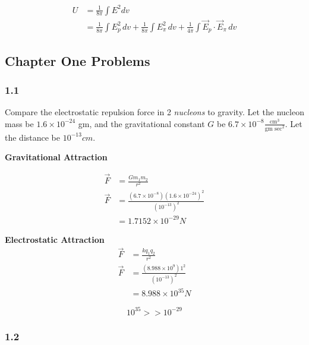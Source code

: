 \documentclass[svgnames]{article}
\begin{document}
 \begin{align*} 
 U &= \frac{1}{8\pi} \int E^2 dv \\
 &= \frac{1}{8\pi} \int E_p^2 \, dv + \frac{1}{8\pi} \int E_\pi^2 \, dv + \frac{1}{4\pi} \int \vec{E}_p \cdot \vec{E}_\pi \, dv
 \end{align*}
 
 \vspace{20px}
 \subsection{Chapter One Problems} 
 
 \subsubsection{1.1} 
 
 Compare the electrostatic repulsion force in 2 \textit{nucleons} to gravity. Let the nucleon mass be $1.6 \times 10^{-24}$ gm, and the gravitational constant $G$ be $ 6.7 \times 10^{-8} \frac{\text{cm}^3}{\text{gm sec}^2}$. Let the distance be $10^{-13} cm$. 
 
 \vspace{20px} 
 
 \textbf{Gravitational Attraction} 
 
 \begin{align*} 
 \vec{F} &= \frac{Gm_1m_2}{r^2} \\
 \vec{F} &= \frac{(6.7 \times 10^{-8}) (1.6 \times 10^{-24})^2}{(10^{-13})^2} \\
 & = 1.7152 \times 10^{-29} N 
 \end{align*}
 
 \vspace{10px} 
 
 \textbf{Electrostatic Attraction} 
 \begin{align*} 
 \vec{F} &= \frac{kq_1q_2}{r^2} \\
 \vec{F} &= \frac{(8.988 \times 10^{9})1^2}{(10^{-13})^2} \\
 & = 8.988 \times 10^{35} N
 \end{align*}
 
\vspace{10px} 

\[ 10^{35} >> 10^{-29} \]

\subsubsection{1.2}
\end{document}
